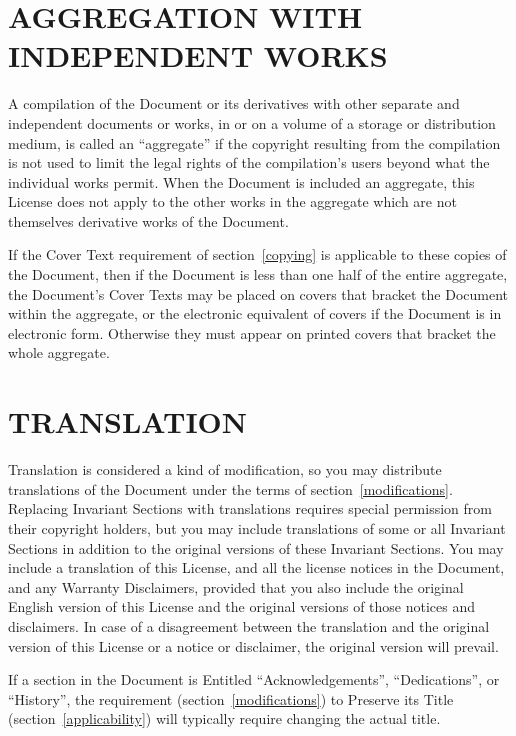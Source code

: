 \documentclass[10pt,a4paper,titlepage,twoside,openright]{report}
\begin{document}
\section*{AGGREGATION WITH INDEPENDENT WORKS}
\label{aggregation}

A compilation of the Document or its derivatives with other separate
and independent documents or works, in or on a volume of a storage or
distribution medium, is called an ``aggregate'' if the copyright
resulting from the compilation is not used to limit the legal rights
of the compilation's users beyond what the individual works permit.
When the Document is included an aggregate, this License does not
apply to the other works in the aggregate which are not themselves
derivative works of the Document.

If the Cover Text requirement of section~\ref{copying} is applicable to
these copies of the Document, then if the Document is less than one half
of the entire aggregate, the Document's Cover Texts may be placed on
covers that bracket the Document within the aggregate, or the
electronic equivalent of covers if the Document is in electronic form.
Otherwise they must appear on printed covers that bracket the whole
aggregate.


\section*{TRANSLATION}
\label{translation}

Translation is considered a kind of modification, so you may
distribute translations of the Document under the terms of
section~\ref{modifications}.
Replacing Invariant Sections with translations requires special
permission from their copyright holders, but you may include
translations of some or all Invariant Sections in addition to the
original versions of these Invariant Sections.  You may include a
translation of this License, and all the license notices in the
Document, and any Warranty Disclaimers, provided that you also include
the original English version of this License and the original versions
of those notices and disclaimers.  In case of a disagreement between
the translation and the original version of this License or a notice
or disclaimer, the original version will prevail.

If a section in the Document is Entitled ``Acknowledgements'',
``Dedications'', or ``History'', the requirement
(section~\ref{modifications}) to Preserve
its Title (section~\ref{applicability}) will typically require
changing the actual title.
\end{document}
